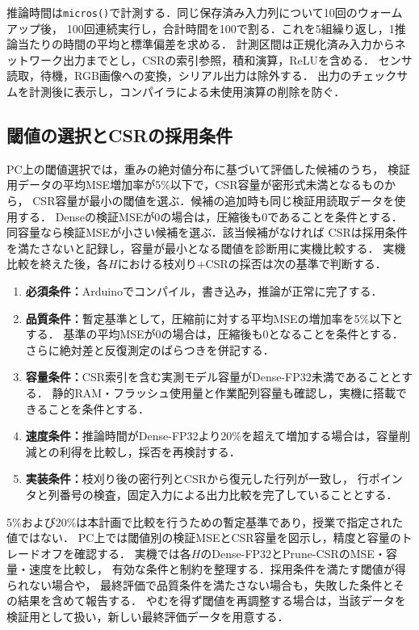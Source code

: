 \documentclass[a4paper,11pt]{article}
\begin{document}
推論時間は\texttt{micros()}で計測する．同じ保存済み入力列について10回のウォームアップ後，
100回連続実行し，合計時間を100で割る．これを5組繰り返し，1推論当たりの時間の平均と標準偏差を求める．
計測区間は正規化済み入力からネットワーク出力までとし，CSRの索引参照，積和演算，ReLUを含める．
センサ読取，待機，RGB画像への変換，シリアル出力は除外する．
出力のチェックサムを計測後に表示し，コンパイラによる未使用演算の削除を防ぐ．

\subsection{閾値の選択とCSRの採用条件}

PC上の閾値選択では，重みの絶対値分布に基づいて評価した候補のうち，
検証用データの平均MSE増加率が5\%以下で，CSR容量が密形式未満となるものから，
CSR容量が最小の閾値を選ぶ．候補の追加時も同じ検証用読取データを使用する．
Denseの検証MSEが0の場合は，圧縮後も0であることを条件とする．
同容量なら検証MSEが小さい候補を選ぶ．該当候補がなければ
CSRは採用条件を満たさないと記録し，容量が最小となる閾値を診断用に実機比較する．
実機比較を終えた後，各$H$における枝刈り+CSRの採否は次の基準で判断する．

\begin{enumerate}
  \item \textbf{必須条件：}Arduinoでコンパイル，書き込み，推論が正常に完了する．
  \item \textbf{品質条件：}暫定基準として，圧縮前に対する平均MSEの増加率を5\%以下とする．
    基準の平均MSEが0の場合は，圧縮後も0となることを条件とする．
    さらに絶対差と反復測定のばらつきを併記する．
  \item \textbf{容量条件：}CSR索引を含む実測モデル容量がDense-FP32未満であることとする．
    静的RAM・フラッシュ使用量と作業配列容量も確認し，実機に搭載できることを条件とする．
  \item \textbf{速度条件：}推論時間がDense-FP32より20\%を超えて増加する場合は，容量削減との利得を比較し，採否を再検討する．
  \item \textbf{実装条件：}枝刈り後の密行列とCSRから復元した行列が一致し，
    行ポインタと列番号の検査，固定入力による出力比較を完了していることとする．
\end{enumerate}

5\%および20\%は本計画で比較を行うための暫定基準であり，授業で指定された値ではない．
PC上では閾値別の検証MSEとCSR容量を図示し，精度と容量のトレードオフを確認する．
実機では各$H$のDense-FP32とPrune-CSRのMSE・容量・速度を比較し，
有効な条件と制約を整理する．採用条件を満たす閾値が得られない場合や，
最終評価で品質条件を満たさない場合も，失敗した条件とその結果を含めて報告する．
やむを得ず閾値を再調整する場合は，当該データを検証用として扱い，新しい最終評価データを用意する．
\end{document}
